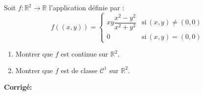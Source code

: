\documentclass[a4paper,twoside,french,11pt]{VcCours}
\newcommand{\corr}{\textbf{Corrigé:}}
\begin{document}
\begin{Exercice}{} Soit $ f : \mathbb{R}^2 \rightarrow \mathbb{R}$ l'application définie par :
 $$f((x,y))=\left\lbrace
  \begin{array}{ll}
 xy\dfrac{x^2-y^2}{x^2+y^2}& \text{si}\: (x,y)\neq (0,0)\\
 0 &\text{si} \:(x,y)=(0,0)
 \end{array}
 \right. $$

 \begin{enumerate}
 \item Montrer que $f$ est continue sur $\mathbb{R}^2$.
 \item Montrer que $f$ est de classe $\mathcal {C}^1$ sur $\mathbb{R}^2$.
 \end{enumerate}
 \end{Exercice}
 
 \corr
 
\end{document}
